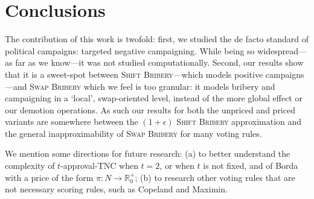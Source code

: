 \documentclass[letterpaper]{article} %
\newtheorem{corollary}{Corollary}
\newcommand{\preals}{\mathbb{R}^{+}_{0}}
\newcommand{\SB}{\textsc{TNC}}
\newcommand{\vcSB}{$\$_{v,c}$-\SB}
\newcommand{\swapB}{\textsc{Swap Bribery}}
\newcommand{\shiftB}{\textsc{Shift Bribery}}
\newcommand{\NP}{\mathrm{NP}}
\newcommand{\Pclass}{\mathrm{P}}
\begin{document}
\section{Conclusions}
The contribution of this work is twofold: first, we studied the de facto standard of political campaigns: targeted negative  campaigning. While being so widespread---as far as we know---it was not studied computationally. Second, our results show that it is a sweet-spot between \shiftB{}---which models positive campaigns---and \swapB{} which we feel is too granular: it models bribery and campaigning in a `local', swap-oriented level, instead of the more global effect or our demotion operations. As such our results for both the unpriced and priced variants are somewhere between the $(1+\epsilon)$ \shiftB{} approximation and the general inapproximability of \swapB{} for many voting rules.

We mention some directions for future research: (a) to better understand the complexity of  $t$-approval-\SB{} when $t=2$, or when $t$ is not fixed, and of Borda with a price  of the form $\pi\colon N \to \preals$; (b) to research other voting rules that are not necessary scoring rules, such as Copeland and Maximin.


\end{document}
